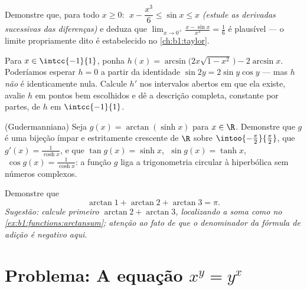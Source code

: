 \begin{exercise}[$\star\star$]\label{exo:b1:functions:9}
Demonstre que, para todo $x \geq 0$: $\;x - \dfrac{x^3}{6} \leq \sin x \leq
x$ \emph{(estude as derivadas sucessivas das diferenças)} e
deduza que $\lim_{x \to 0^+} \frac{x - \sin x}{x^3} = \frac 16$ é
plausível --- o limite propriamente dito é estabelecido no
\cref{ch:b1:taylor}.
\end{exercise}

\begin{exercise}[$\star\star\star$]\label{exo:b1:functions:10}
Para $x \in \intcc{-1}{1}$, ponha
$h(x) = \arcsin\bigl(2x\sqrt{1 - x^2}\,\bigr) - 2\arcsin x$. Poderíamos
esperar $h = 0$ a partir da identidade $\sin 2y = 2\sin y\cos y$ --- mas
$h$ \emph{não} é identicamente nula. Calcule $h'$ nos intervalos abertos
em que ela existe, avalie $h$ em pontos bem escolhidos e dê a descrição
completa, constante por partes, de $h$ em $\intcc{-1}{1}$.
\end{exercise}

\begin{exercise}[$\star\star\star$]\label{exo:b1:functions:11}
(Gudermanniana) Seja $g(x) = \arctan(\sinh x)$ para $x \in \R$. Demonstre
que $g$ é uma bijeção ímpar e estritamente crescente de $\R$ sobre
$\intoo{-\frac\pi2}{\frac\pi2}$, que $g'(x) = \frac{1}{\cosh x}$,
e que $\tan g(x) = \sinh x$, $\;\sin g(x) = \tanh x$,
$\;\cos g(x) = \frac{1}{\cosh x}$: a função $g$ liga a trigonometria
circular à hiperbólica sem números complexos.
\end{exercise}

\begin{exercise}[$\star\star$]\label{exo:b1:functions:12}
Demonstre que
\[
\arctan 1 + \arctan 2 + \arctan 3 = \pi .
\]
\emph{Sugestão: calcule primeiro $\arctan 2 + \arctan 3$, localizando a
soma como no \cref{ex:b1:functions:arctansum}; atenção ao fato de que o
denominador da fórmula de adição é negativo aqui.}
\end{exercise}

\section{Problema: A equação $x^y = y^x$}

